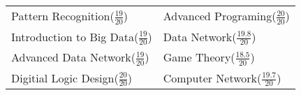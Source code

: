 \begin{tabular}{ll}
  Pattern Recognition($\frac{19}{20}$)      &Advanced Programing($\frac{20}{20}$) \\
  Introduction to Big Data($\frac{19}{20}$) &Data Network($\frac{19.8}{20}$) \\
  Advanced Data Network($\frac{19}{20}$)    &Game Theory($\frac{18.5}{20}$) \\
  Digitial Logic Design($\frac{20}{20}$)    &Computer Network($\frac{19.7}{20}$) \\
\end{tabular}
